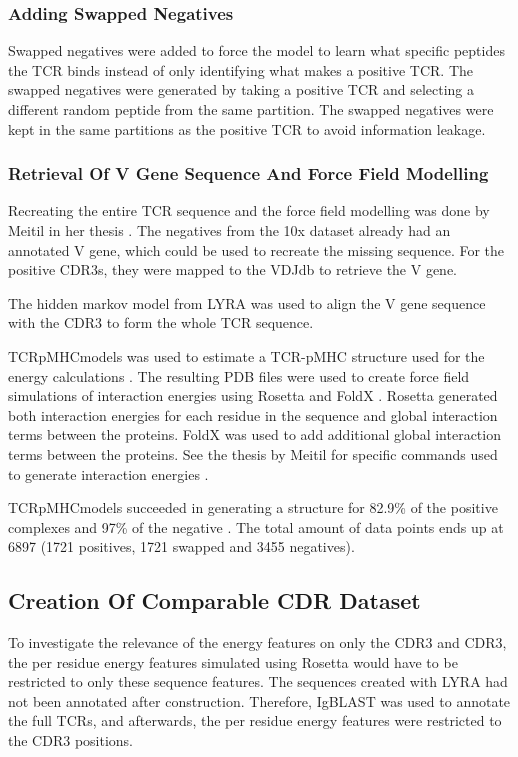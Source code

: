 \subsubsection{Adding Swapped Negatives}
Swapped negatives were added to force the model to learn what specific peptides the TCR binds instead of only identifying what makes a positive TCR. The swapped negatives were generated by taking a positive TCR and selecting a different random peptide from the same partition. The swapped negatives were kept in the same partitions as the positive TCR to avoid information leakage.

\subsubsection{Retrieval Of V Gene Sequence And Force Field Modelling}
Recreating the entire TCR sequence and the force field modelling was done by Meitil in her thesis \cite{Meitil2021UsingPrediction}. The negatives from the 10x dataset already had an annotated V gene, which could be used to recreate the missing sequence. For the positive CDR3s, they were mapped to the VDJdb to retrieve the V gene. 

The hidden markov model from LYRA \cite{Klausen2015LYRAModeling} was used to align the V gene sequence with the CDR3 to form the whole TCR sequence.

TCRpMHCmodels was used to estimate a TCR-pMHC structure used for the energy calculations \cite{Jensen2019TCRpMHCmodels:Complexes}. The resulting PDB files were used to create force field simulations of interaction energies using Rosetta and FoldX \cite{Schymkowitz2005TheField, Alford2017TheDesign}. Rosetta generated both interaction energies for each residue in the sequence and global interaction terms between the proteins. FoldX was used to add additional global interaction terms between the proteins. See the thesis by Meitil for specific commands used to generate interaction energies \cite{Meitil2021UsingPrediction}.

TCRpMHCmodels succeeded in generating a structure for 82.9\% of the positive complexes and 97\% of the negative \cite{Meitil2021UsingPrediction}. The total amount of data points ends up at 6897 (1721 positives, 1721 swapped and 3455 negatives).

\subsection{Creation Of Comparable CDR Dataset}
To investigate the relevance of the energy features on only the CDR3{\textalpha} and CDR3{\textbeta}, the per residue energy features simulated using Rosetta would have to be restricted to only these sequence features. The sequences created with LYRA had not been annotated after construction. Therefore, IgBLAST \cite{Ye2013IgBLAST:Tool.} was used to annotate the full TCRs, and afterwards, the per residue energy features were restricted to the CDR3 positions.

